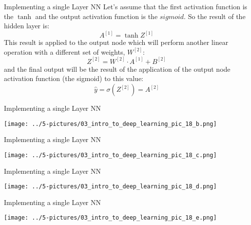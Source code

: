 \documentclass[11pt]{beamer}
\begin{document}
\begin{frame}{Implementing a single Layer NN}
Let's assume that the first activation function is the $\tanh$ and the output activation function is the $sigmoid$. So the result of the hidden layer is:
$$ A^{[1]} = \tanh{Z^{[1]}} $$
This result is applied to the output node which will perform another linear operation with a different set of weights, $W^{[2]}$:
$$ Z^{[2]} = W^{[2]} \cdot A^{[1]} + B^{[2]} $$
and the final output will be the result of the application of the output node activation function (the sigmoid) to this value:
$$ \hat{y} = \sigma({Z^{[2]}}) = A^{[2]}$$
\end{frame}
\begin{frame}{Implementing a single Layer NN}
\begin{center}
\texttt{[image: ../5-pictures/03\_intro\_to\_deep\_learning\_pic\_18\_b.png]} \end{center}
\end{frame}
\begin{frame}{Implementing a single Layer NN}
\begin{center}
\texttt{[image: ../5-pictures/03\_intro\_to\_deep\_learning\_pic\_18\_c.png]} \end{center}
\end{frame}
\begin{frame}{Implementing a single Layer NN}
\begin{center}
\texttt{[image: ../5-pictures/03\_intro\_to\_deep\_learning\_pic\_18\_d.png]} \end{center}
\end{frame}
\begin{frame}{Implementing a single Layer NN}
\begin{center}
\texttt{[image: ../5-pictures/03\_intro\_to\_deep\_learning\_pic\_18\_e.png]} \end{center}
\end{frame}
\end{document}
